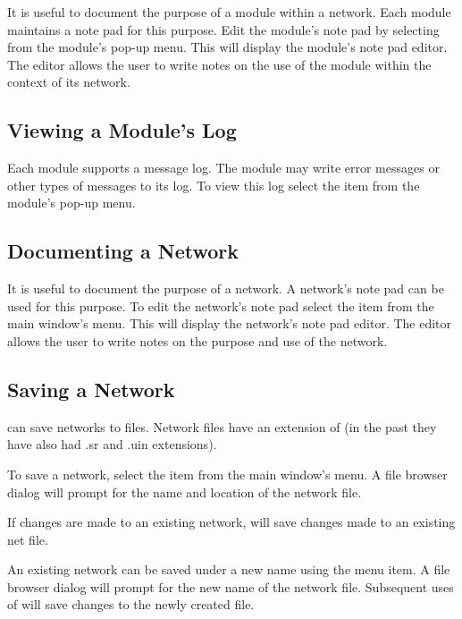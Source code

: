 It is useful to document the purpose of a module within a network.
Each module maintains a note pad for this purpose.  Edit the
module's note pad by selecting  from the module's
pop-up menu.  This will display the module's note pad editor.  The 
editor allows the user to write notes on the use of the
module within the context of its network.

\subsection{Viewing a Module's Log}
\label{sec:viewmodslog}

Each module supports a message log.  The module may write error messages or
other types of messages to its log.  To view this log select the
 item from the module's pop-up menu.

\subsection{Documenting a Network}
\label{sec:docnetwork}

It is useful to document the purpose of a network.  A network's
note pad can be used for this purpose.  To edit the network's note pad select the
 item from the main window's  menu.  This
will display the network's note pad editor.  The editor allows the user
to write notes on the purpose and use of the network.


\subsection{Saving a Network}
\label{sec:savenet}

\sr{} can save networks to files.  Network files have an extension of
 (in the past they have also had .sr and .uin
extensions).  

To save a network, select the  item from the main window's
 menu.  A file browser dialog will prompt for the
name and location of the network file.

If  changes are made to an existing network,   will
save changes made to an existing net file.

An existing network can be saved under a new name using the
 menu item.  A file browser dialog will prompt
for the new name of the network file.  Subsequent uses of
 will save changes to the newly created file.

